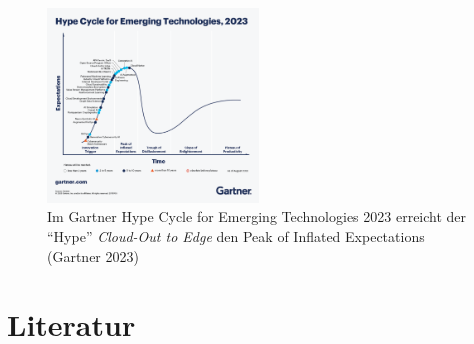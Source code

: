 \documentclass[
  11pt,
  a4paper,
  oneside, openany  ,captions=tableheading
]{scrbook}
\theoremstyle{remark}
\begin{document}
\begin{figure}[H]

{\centering \includegraphics[width=0.5\textwidth,height=\textheight]{images/gartner_hypecycle_2023.png}

}

\caption{Im Gartner Hype Cycle for Emerging Technologies 2023 erreicht
der ``Hype'' \emph{Cloud-Out to Edge} den Peak of Inflated Expectations
(Gartner 2023)}

\end{figure}%

\chapter*{Literatur}\label{literatur}

\end{document}
